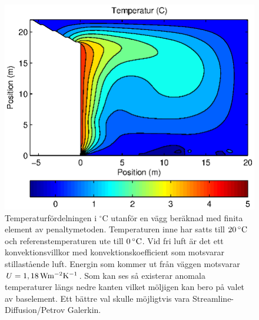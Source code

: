 \begin{figure}[hpbt]
\centering
\includegraphics{images/convectemperature.eps}
\caption{Temperaturfördelningen i $^\circ\mbox{C}$ utanför en vägg beräknad med finita element av
penaltymetoden. Temperaturen inne har satts till $\unit[20]{^\circ C}$ och
referenstemperaturen ute till $\unit[0]{^\circ C}$. Vid fri luft är det ett konvektionsvillkor med
konvektionskoefficient som motsvarar stillastående luft. Energin som kommer ut från väggen motsvarar
$U = \unit[1,18]{Wm^{-2}K^{-1}}$. Som kan ses så existerar anomala temperaturer längs nedre kanten vilket
möljigen kan bero på valet av baselement. Ett bättre val skulle möjligtvis
vara Streamline-Diffusion/Petrov Galerkin.}
\end{figure}

